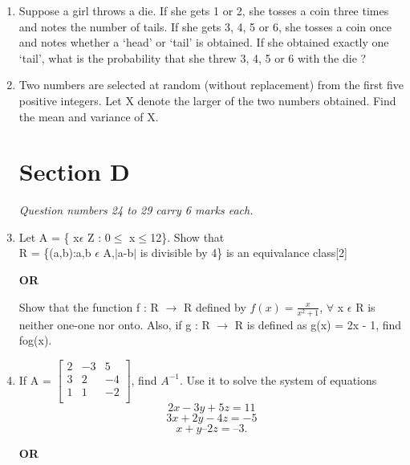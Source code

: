 \documentclass[journal,12pt,twocolumn]{IEEEtran}
\begin{document}
\begin{enumerate}
     
     
     \item Suppose a girl throws a die. If she gets 1 or 2, she tosses a coin three times and notes the number of tails. If she gets 3, 4, 5 or 6, she tosses a coin once and notes whether a ‘head’ or ‘tail’ is obtained. If she obtained exactly one ‘tail’, what is the probability that she threw 3, 4, 5 or 6 with the die ?
    
    \item Two numbers are selected at random (without replacement) from the first five positive integers. Let X denote the larger of the two numbers obtained. Find the mean and variance of X.
    
    \begin{center}
    \section*{Section D}
    \end{center}
    
    \begin{flushleft}
    \textit{Question numbers 24 to 29 carry 6 marks each.}
    \end{flushleft}
    
    \item Let A = \{ x$\epsilon$ Z : 0$\leq$ x$\leq$12\}. Show that\\
    R = \{(a,b):a,b $\epsilon$ A,$\lvert$a-b$\rvert$ is divisible by 4\} is an equivalance class[2]
    
    \begin{center}
    \textbf{OR}
    \end{center}
    
    Show that the function f : R $\rightarrow$ R defined by $f(x) = \frac{x}{x^{2} + 1}$, $\forall$ x $\epsilon$ R is neither one-one nor onto. Also, if g : R $\rightarrow$ R is defined as g(x) = 2x - 1, find fog(x).
    
    \item\noindent If A = 
    $\begin{bmatrix}
     2 & -3 & 5 \\
     3 & 2 & -4 \\
     1 & 1 & -2 \\
     \end{bmatrix} $,
     find $A^{-1}$. Use it to solve the system of equations 
     $$2x - 3y + 5z = 11$$
     $$3x + 2y -4z = -5$$
     $$x + y – 2z = – 3.$$
     
     \begin{center}
     \textbf{OR}
     \end{center}
     

\end{enumerate}
\end{document}
